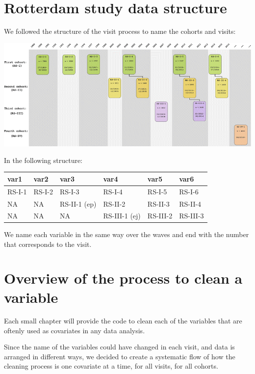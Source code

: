 \documentclass[]{book}
\begin{document}
\hypertarget{rotterdam-study-data-structure}{%
\section{Rotterdam study data structure}\label{rotterdam-study-data-structure}}

We followed the structure of the visit process to name the cohorts and visits:

\includegraphics[width=1\linewidth]{./rs}

In the following structure:

\begin{tabular}{l|l|l|l|l|l}
\hline
var1 & var2 & var3 & var4 & var5 & var6\\
\hline
RS-I-1 & RS-I-2 & RS-I-3 & RS-I-4 & RS-I-5 & RS-I-6\\
\hline
NA & NA & RS-II-1 (ep) & RS-II-2 & RS-II-3 & RS-II-4\\
\hline
NA & NA & NA & RS-III-1 (ej) & RS-III-2 & RS-III-3\\
\hline
\end{tabular}

We name each variable in the same way over the waves and end with the number that corresponds to the visit.

\hypertarget{overview-of-the-process-to-clean-a-variable}{%
\section{Overview of the process to clean a variable}\label{overview-of-the-process-to-clean-a-variable}}

Each small chapter will provide the code to clean each of the variables that are oftenly used as covariates in any data analysis.

Since the name of the variables could have changed in each visit, and data is arranged in different ways, we decided to create a systematic flow of how the cleaning process is one covariate at a time, for all visits, for all cohorts.
\end{document}
